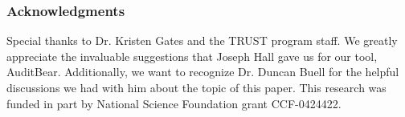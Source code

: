 \subsubsection{Acknowledgments}
Special thanks to Dr. Kristen Gates and the TRUST
program staff.  We greatly appreciate the invaluable suggestions that Joseph
Hall gave us for our tool, AuditBear.  Additionally, we want to recognize
Dr. Duncan Buell for the helpful discussions we had with him about the topic of
this paper. This research was funded in part by National Science Foundation
grant CCF-0424422.
